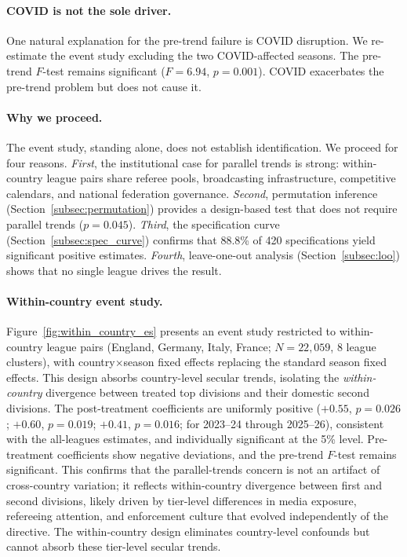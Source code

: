\documentclass[12pt]{article}
\begin{document}
\paragraph{COVID is not the sole driver.} One natural explanation for the pre-trend failure is COVID disruption. We re-estimate the event study excluding the two COVID-affected seasons. The pre-trend $F$-test remains significant ($F = 6.94$, $p = 0.001$). COVID exacerbates the pre-trend problem but does not cause it.

\paragraph{Why we proceed.} The event study, standing alone, does not establish identification. We proceed for four reasons. \textit{First}, the institutional case for parallel trends is strong: within-country league pairs share referee pools, broadcasting infrastructure, competitive calendars, and national federation governance. \textit{Second}, permutation inference (Section~\ref{subsec:permutation}) provides a design-based test that does not require parallel trends ($p = 0.045$). \textit{Third}, the specification curve (Section~\ref{subsec:spec_curve}) confirms that 88.8\% of 420 specifications yield significant positive estimates. \textit{Fourth}, leave-one-out analysis (Section~\ref{subsec:loo}) shows that no single league drives the result.

\paragraph{Within-country event study.} Figure~\ref{fig:within_country_es} presents an event study restricted to within-country league pairs (England, Germany, Italy, France; $N = 22{,}059$, 8 league clusters), with country$\times$season fixed effects replacing the standard season fixed effects. This design absorbs country-level secular trends, isolating the \emph{within-country} divergence between treated top divisions and their domestic second divisions. The post-treatment coefficients are uniformly positive ($+0.55$, $p = 0.026$; $+0.60$, $p = 0.019$; $+0.41$, $p = 0.016$; for 2023--24 through 2025--26), consistent with the all-leagues estimates, and individually significant at the 5\% level. Pre-treatment coefficients show negative deviations, and the pre-trend $F$-test remains significant. This confirms that the parallel-trends concern is not an artifact of cross-country variation; it reflects within-country divergence between first and second divisions, likely driven by tier-level differences in media exposure, refereeing attention, and enforcement culture that evolved independently of the directive. The within-country design eliminates country-level confounds but cannot absorb these tier-level secular trends.
\end{document}
